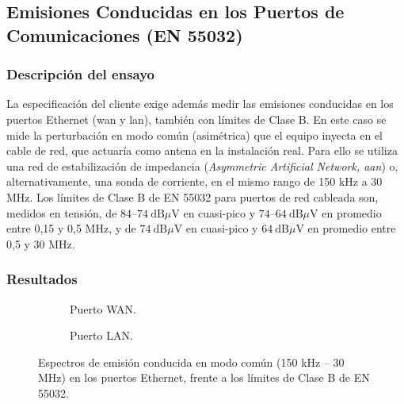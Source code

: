 

\subsection{Emisiones Conducidas en los Puertos de Comunicaciones (EN 55032)}
\label{subsec:emisiones_conducidas_eth}

\subsubsection*{Descripción del ensayo}

La especificación del cliente exige además medir las emisiones conducidas en los puertos Ethernet (\gls{wan} y \gls{lan}), también con límites de Clase B. En este caso se mide la perturbación en modo común (asimétrica) que el equipo inyecta en el cable de red, que actuaría como antena en la instalación real. Para ello se utiliza una red de estabilización de impedancia (\textit{Asymmetric Artificial Network, \gls{aan}}) o, alternativamente, una sonda de corriente, en el mismo rango de 150 kHz a 30 MHz. Los límites de Clase B de EN 55032 para puertos de red cableada son, medidos en tensión, de $84$--$74\ \text{dB}\mu\text{V}$ en cuasi-pico y $74$--$64\ \text{dB}\mu\text{V}$ en promedio entre 0,15 y 0,5 MHz, y de $74\ \text{dB}\mu\text{V}$ en cuasi-pico y $64\ \text{dB}\mu\text{V}$ en promedio entre 0,5 y 30 MHz.

\subsubsection*{Resultados}

\begin{figure}[htbp]
    \centering
    \begin{subfigure}[b]{0.48\textwidth}
        \centering
        \caption{Puerto WAN.}
        \label{fig:ec_eth_WAN}
    \end{subfigure}
    \hfill
    \begin{subfigure}[b]{0.48\textwidth}
        \centering
        \caption{Puerto LAN.}
        \label{fig:ec_eth_LAN}
    \end{subfigure}
    \caption{Espectros de emisión conducida en modo común (150 kHz -- 30 MHz) en los puertos Ethernet, frente a los límites de Clase B de EN 55032.}
    \label{fig:ec_eth}
\end{figure}

